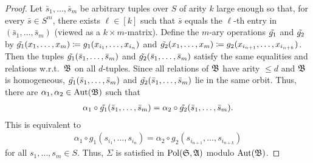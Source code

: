 \begin{proof}
        
        
        Let $\bar{s}_1,\dots,\bar{s}_{m}$ be arbitrary tuples over $S$ of arity $k$ large enough so that, for every  $\bar{s}\in S^{m}$, there exists $\ell \in [k]$ such that $\bar{s}$ equals the $\ell$-th entry in $(\bar{s}_1,\dots,\bar{s}_{m})$ (viewed as a $k\times m$-matrix).
        Define the $m$-ary operations $\Tilde{g_1}$ and $\Tilde{g_2}$ by  $\Tilde{g_1}(x_1,\dots,x_m) \coloneqq g_1(x_{i_1},\dots,x_{i_n})$ and  $\Tilde{g_2}(x_1,\dots,x_m) \coloneqq g_2(x_{i_{n+1}},\dots,x_{i_{n+k}})$. 
        Then the tuples $\Tilde{g_1}(\bar{s}_1,\dots,\bar{s}_{m})$ and $\Tilde{g_2}(\bar{s}_1,\dots,\bar{s}_m)$ satisfy the same equalities and relations w.r.t.~$\struct{B}$ on all $d$-tuples.
        Since all relations of $\struct{B}$ have arity $\leq d$ and $\struct{B}$ is homogeneous, $\Tilde{g_1}(\bar{s}_1,\dots,\bar{s}_{m})$ and $\Tilde{g_2}(\bar{s}_1,\dots,\bar{s}_m)$ lie in the same orbit.
        Thus, there are $\alpha_1,\alpha_2\in\Aut(\struct{B})$ such that
        \begin{align*}
            \alpha_1\circ\Tilde{g_1}(\bar{s}_1,\dots,\bar{s}_{m})=\alpha_2\circ\Tilde{g_2}(\bar{s}_1,\dots,\bar{s}_{m}).
        \end{align*}
        This is equivalent to
        \begin{align*}
            \alpha_1\circ g_1(s_{i_1},\dots,s_{i_n})=\alpha_2\circ g_2(s_{i_{n+1}},\dots,s_{i_{n+k}})
        \end{align*}
        for all $s_1,\dots,s_{m}\in S$. Thus, $\Sigma$ is satisfied in $\Pol(\struct{S},\struct{A})$ modulo $\Aut(\struct{B})$. 
    \end{proof} 

